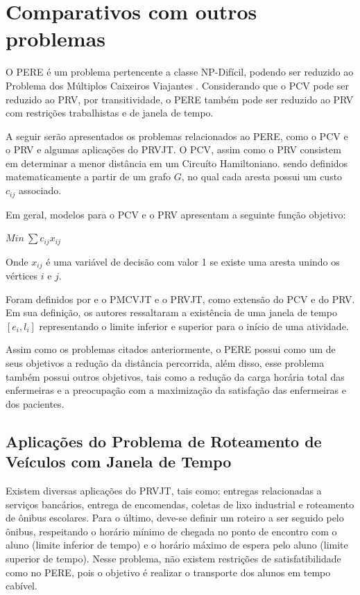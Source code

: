 \section{\esp Comparativos com outros problemas } \label{aplicacoes}

O \ac{PERE} é um problema pertencente a classe NP-Difícil, podendo ser reduzido ao Problema dos Múltiplos Caixeiros Viajantes . Considerando que o \ac{PCV} pode ser reduzido ao \ac{PRV}, por transitividade, o \ac{PERE} também pode ser reduzido ao \ac{PRV} com restrições trabalhistas e de janela de tempo. 

A seguir serão apresentados os problemas relacionados ao \ac{PERE}, como o \ac{PCV} e o \ac{PRV} e algumas aplicações do \ac{PRVJT}. O \ac{PCV}, assim como o \ac{PRV} consistem em determinar a menor distância em um Circuíto Hamiltoniano. sendo definidos matematicamente  a partir de um grafo $G$, no qual cada aresta possui um custo $c_{ij}$ associado.

Em geral, modelos para o \ac{PCV} e o \ac{PRV} apresentam a seguinte função objetivo:

\begin{center}
$Min~\sum c_{ij}x_{ij}$
\end{center}

Onde $x_{ij}$ é uma variável de decisão com valor 1 se existe uma aresta unindo os vértices $i$ e $j$.

Foram definidos por  e  o \ac{PMCVJT} e o \ac{PRVJT}, como extensão do \ac{PCV} e do \ac{PRV}.
Em sua definição, os autores ressaltaram a existência de uma janela de tempo $[e_i, l_i]$ representando o limite inferior e superior para o início de uma atividade.

Assim como os problemas citados anteriormente, o \ac{PERE} possui como um de seus objetivos a redução da distância percorrida, além disso, esse problema também possui outros objetivos, tais como a redução da carga horária total das enfermeiras e a preocupação com a maximização da satisfação das enfermeiras e dos pacientes.

\subsection{Aplicações do Problema de Roteamento de Veículos com Janela de Tempo}

Existem diversas aplicações do \ac{PRVJT}, tais como: entregas relacionadas a serviços bancários, entrega de encomendas, coletas de lixo industrial e roteamento de ônibus escolares. Para o último, deve-se definir um roteiro a ser seguido pelo ônibus, respeitando o horário mínimo de chegada no ponto de encontro com o aluno (limite inferior de tempo) e o horário máximo de espera pelo aluno (limite superior de tempo). Nesse problema, não existem restrições de satisfatibilidade como no \ac{PERE}, pois o objetivo é realizar o transporte dos alunos em tempo cabível.

